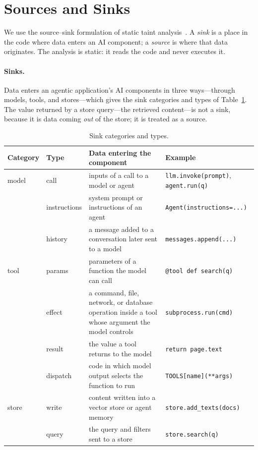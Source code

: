 \section{Sources and Sinks}
\label{sec:df-model}

We use the source--sink formulation of static taint analysis~\cite{livshits2005,arzt2014flowdroid}. A \emph{sink} is a place in the code where data enters an AI component; a \emph{source} is where that data originates. The analysis is static: it reads the code and never executes it.

\paragraph{Sinks.} Data enters an agentic application's AI components in three ways---through models, tools, and stores---which gives the sink categories and types of Table~\ref{tab:df-sinks}. The value returned by a store query---the retrieved content---is not a sink, because it is data coming \emph{out} of the store; it is treated as a source.

\begin{table}[t]
\centering
\footnotesize
\renewcommand{\arraystretch}{1.2}
\setlength{\tabcolsep}{4pt}
\caption{Sink categories and types.}
\label{tab:df-sinks}
\begin{tabular}{@{}>{\raggedright\arraybackslash}p{}>{\raggedright\arraybackslash}p{}>{\raggedright\arraybackslash}p{}>{\raggedright\arraybackslash}p{}@{}}
\toprule
\textbf{Category} & \textbf{Type} & \textbf{Data entering the component} & \textbf{Example} \\
\midrule
model & call & inputs of a call to a model or agent & \texttt{llm.invoke(prompt)}, \texttt{agent.run(q)} \\
      & instructions & system prompt or instructions of an agent & \texttt{Agent(instructions=...)} \\
      & history & a message added to a conversation later sent to a model & \texttt{messages.append(...)} \\
\addlinespace[2pt]
tool  & params & parameters of a function the model can call & \texttt{@tool def search(q)} \\
      & effect & a command, file, network, or database operation inside a tool whose argument the model controls & \texttt{subprocess.run(cmd)} \\
      & result & the value a tool returns to the model & \texttt{return page.text} \\
      & dispatch & code in which model output selects the function to run & \texttt{TOOLS[name](**args)} \\
\addlinespace[2pt]
store & write & content written into a vector store or agent memory & \texttt{store.add\_texts(docs)} \\
      & query & the query and filters sent to a store & \texttt{store.search(q)} \\
\bottomrule
\end{tabular}
\end{table}

